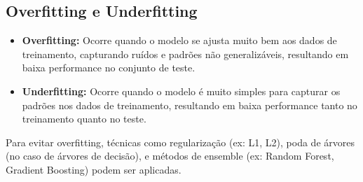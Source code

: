\documentclass{article}
\begin{document}
\subsection{Overfitting e Underfitting}

\begin{itemize}
    \item \textbf{Overfitting:} Ocorre quando o modelo se ajusta muito bem aos dados de treinamento, capturando ruídos e padrões não generalizáveis, resultando em baixa performance no conjunto de teste.
    \item \textbf{Underfitting:} Ocorre quando o modelo é muito simples para capturar os padrões nos dados de treinamento, resultando em baixa performance tanto no treinamento quanto no teste.
\end{itemize}

Para evitar overfitting, técnicas como regularização (ex: L1, L2), poda de árvores (no caso de árvores de decisão), e métodos de ensemble (ex: Random Forest, Gradient Boosting) podem ser aplicadas.
\end{document}
